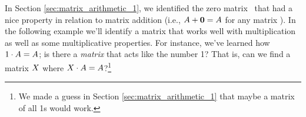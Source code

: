 In Section \ref{sec:matrix_arithmetic_1}, we identified the zero matrix \tto\ that had a nice property in relation to matrix addition (i.e., $A+\textbf{0} = A$ for any matrix \tta). In the following example we'll identify a matrix that works well with multiplication as well as some multiplicative properties. For instance, we've learned how $1\cdot A = A$; is there a \textit{matrix} that acts like the number 1? That is, can we find a matrix $X$ where $X\cdot A=A$?\footnote{We made a guess in Section \ref{sec:matrix_arithmetic_1} that maybe a matrix of all 1s would work.}\\

